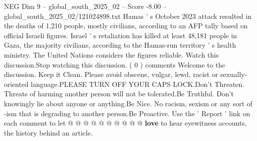 \begin{textsample}{NEG Dim 9 – global\_south\_2025\_02 – Score -8.00 – global\_south\_2025\_02/121024898.txt}
Hamas ' s October 2023 attack resulted in the deaths of 1,210 people, mostly civilians, according to an AFP tally based on official Israeli figures.
Israel ' s retaliation has killed at least 48,181 people in Gaza, the majority civilians, according to the Hamas-run territory ' s health ministry.
The United Nations considers the figures reliable.
Watch this discussion.Stop watching this discussion. ( 0 ) comments Welcome to the discussion.
Keep it Clean.
Please avoid obscene, vulgar, lewd, racist or sexually-oriented language.PLEASE TURN OFF YOUR CAPS LOCK.Don't Threaten.
Threats of harming another person will not be tolerated.Be Truthful.
Don't knowingly lie about anyone or anything.Be Nice.
No racism, sexism or any sort of -ism that is degrading to another person.Be Proactive.
Use the ' Report ' link on each comment to let @ @ @ @ @ @ @ @ @ @ \textbf{love} to hear eyewitness accounts, the history behind an article.

\end{textsample}
